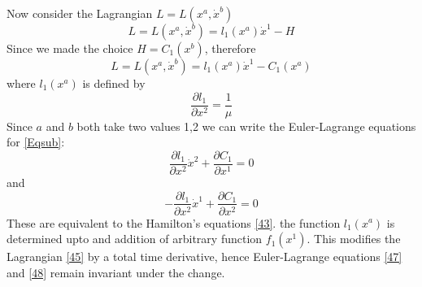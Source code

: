 \documentclass[12pt]{article}
\begin{document}
Now consider the Lagrangian $L=L\left(x^{a}, \dot{x}^{b}\right)$
\begin{equation}
L=L\left(x^{a}, \dot{x}^{b}\right)=l_{1}\left(x^{a}\right) \dot{x}^{1}-H
\label{71}
\end{equation}
Since we made the choice $H=C_{1}(x^{b})$, therefore
\begin{equation}
L=L\left(x^{a}, \dot{x}^{b}\right)=l_{1}\left(x^{a}\right) \dot{x}^{1}-C_{1}\left(x^{a}\right)
\label{72}
\end{equation}
where $l_{1}(x^{a})$ is defined by
\begin{equation}
\frac{\partial l_{1}}{\partial x^{2}}=\frac{1}{\mu}
\label{73}
\end{equation}
Since $a$ and $b$ both take two values 1,2 we can write the Euler-Lagrange equations for \eqref{Eqsub}:
\begin{equation}
\frac{\partial l_{1}}{\partial x^{2}} \dot{x}^{2}+\frac{\partial C_{1}}{\partial x^{1}}=0 \label{74}
\end{equation}
and 
\begin{equation}
-\frac{\partial l_{1}}{\partial x^{2}} \dot{x}^{1}+\frac{\partial C_{1}}{\partial x^{2}}=0
\label{75}
\end{equation}
These are equivalent to the Hamilton's equations \eqref{43}. the function $l_{1}(x^{a})$ is determined upto and addition of arbitrary function $f_{1}(x^{1})$. This modifies the Lagrangian \eqref{45} by a total time derivative, hence Euler-Lagrange equations \eqref{47} and \eqref{48} remain invariant under the change.
\end{document}
